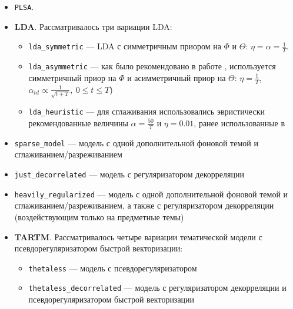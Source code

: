 \begin{itemize} 

    \item \texttt{PLSA}. 

    \item \textbf{LDA}. Рассматривалось три вариации LDA: 

    \begin{itemize} 

        \item \texttt{lda\_symmetric} --- LDA с симметричным приором на $\Phi$ и $\Theta$: $\eta = \alpha = \frac{1}{T}$. 

        \item \texttt{lda\_asymmetric} --- как было рекомендовано в работе \cite{wallach2009rethinking}, используется симметричный приор на $\Phi$ и асимметричный приор на $\Theta$: $\eta=\frac{1}{T}$, $\alpha_{td}\propto\frac{1}{\sqrt{t + T}},~0\leq t \leq T$) 

        \item \texttt{lda\_heuristic} --- для сглаживания использовались эвристически рекомендованные величины $\alpha=\frac{50}{T}$ и $\eta=0.01$, ранее использованные в \cite{biggers2014configuring}\cite{rosen2016mobile} 

    \end{itemize} 

    \item \texttt{sparse\_model} --- модель с одной дополнительной фоновой темой и сглаживанием/разреживанием 

    \item \texttt{just\_decorrelated} --- модель с регуляризатором декорреляции 

    \item \texttt{heavily\_regularized} --- модель с одной дополнительной фоновой темой и сглаживанием/разреживанием, а также с регуляризатором декорреляции (воздействующим только на предметные темы) 

    \item \textbf{TARTM}. Рассматривалось четыре вариации тематической модели с псевдорегуляризатором быстрой векторизации: 

    \begin{itemize} 

        \item \texttt{thetaless} --- модель с псевдорегуляризатором 

        \item \texttt{thetaless\_decorrelated} --- модель с регуляризатором декорреляции и псевдорегуляризатором быстрой векторизации 


\end{itemize}
\end{itemize}
